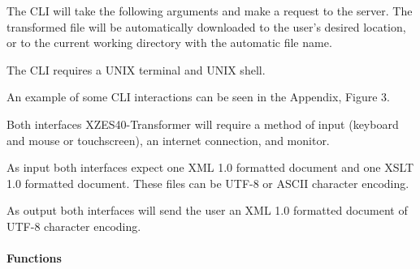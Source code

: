 The CLI will take the following arguments and make a  request to the server.
The transformed file will be automatically downloaded to the user's desired location, or to the current working directory with the automatic file name.

The CLI requires a UNIX terminal and UNIX shell.

An example of some CLI interactions can be seen in the Appendix, Figure 3.

Both interfaces XZES40-Transformer will require a method of input (keyboard and mouse or touchscreen), an internet connection, and monitor.

As input both interfaces expect one XML 1.0 formatted document and one XSLT 1.0 formatted document.
These files can be UTF-8 or ASCII character encoding.

As output both interfaces will send the user an XML 1.0 formatted document of UTF-8 character encoding.

% 

\paragraph{Functions}

